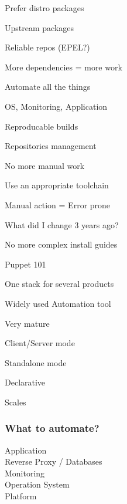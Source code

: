 \begin{iframe}[Dependencies]
\item{Prefer distro packages}
\item{Upstream packages}
\item{Reliable repos (EPEL?)}
\item{More dependencies = more work}
\end{iframe}


\begin{iframe}[Automation]
\item Automate all the things
\item OS, Monitoring, Application
\item Reproducable builds
\item Repositories management
\end{iframe}
\begin{iframe}
\item No more manual work
\item Use an appropriate toolchain
\item Manual action = Error prone
\item What did I change 3 years ago?
\end{iframe}

\begin{iframe}[Documentation]
\item No more complex install guides
\item Puppet 101
\item One stack for several products
\end{iframe}


\begin{iframe}[Puppet]
\item Widely used Automation tool\pause
\item Very mature\pause
\item Client/Server mode\pause
\item Standalone mode\pause
\item Declarative\pause
\item Scales
\end{iframe}

\begin{frame}
    \frametitle{What to automate?}
    \huge
    Application\\
    Reverse Proxy / Databases\\
    Monitoring\\
    Operation System\\
    Platform
\end{frame}

